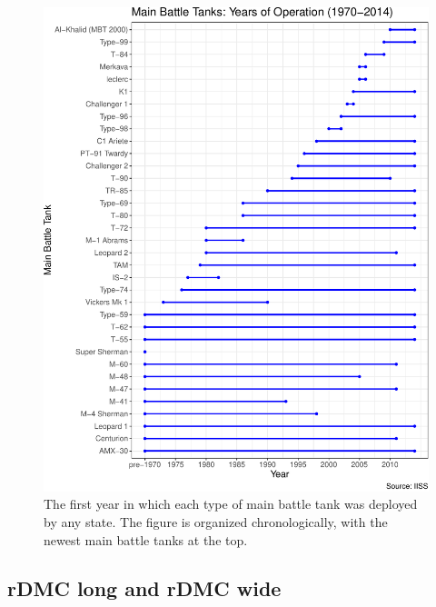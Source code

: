 \documentclass[
]{article}
\begin{document}
\begin{figure}[H]

{\centering \includegraphics{2021-09-24_rDMC_files/figure-latex/mbt-invention-1} 

}

\caption{The first year in which each type of main battle tank was deployed by any state. The figure is organized chronologically, with the newest main battle tanks at the top.}\label{fig:mbt-invention}
\end{figure}

\hypertarget{rdmc-long-and-rdmc-wide}{%
\subsection{rDMC long and rDMC wide}\label{rdmc-long-and-rdmc-wide}}
\end{document}

